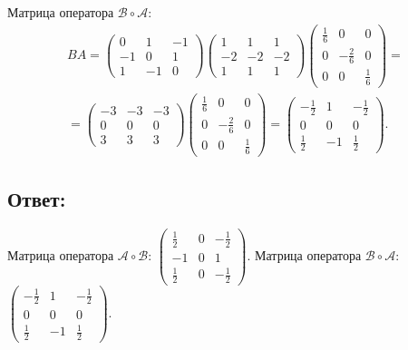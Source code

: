 \documentclass[12pt]{article}
\begin{document}
    Матрица оператора $\mathcal{B} \circ \mathcal{A}$:
    \begin{multline*}
        B A =
        \begin{pmatrix}
            0  & 1  & -1 \\
            -1 & 0  & 1  \\
            1  & -1 & 0
        \end{pmatrix}
        \begin{pmatrix}
            1  & 1  & 1  \\
            -2 & -2 & -2 \\
            1  & 1  & 1
        \end{pmatrix}
        \begin{pmatrix}
            \frac{1}{6} & 0             & 0           \\
            0           & - \frac{2}{6} & 0           \\
            0           & 0             & \frac{1}{6}
        \end{pmatrix} = \\
        =
        \begin{pmatrix}
            -3 & -3 & -3 \\
            0  & 0  & 0  \\
            3  & 3  & 3
        \end{pmatrix}
        \begin{pmatrix}
            \frac{1}{6} & 0             & 0           \\
            0           & - \frac{2}{6} & 0           \\
            0           & 0             & \frac{1}{6}
        \end{pmatrix}
        =
        \begin{pmatrix}
            -\frac{1}{2} & 1   & - \frac{1}{2} \\
            0            & 0   & 0             \\
            \frac{1}{2}  & - 1 & \frac{1}{2}
        \end{pmatrix} .
    \end{multline*}

    \subsection*{Ответ:}
    Матрица оператора $\mathcal{A} \circ \mathcal{B}$:
    $
    \begin{pmatrix}
        \frac{1}{2} & 0 & - \frac{1}{2} \\
        - 1         & 0 & 1             \\
        \frac{1}{2} & 0 & - \frac{1}{2}
    \end{pmatrix}
    $.
    Матрица оператора $\mathcal{B} \circ \mathcal{A}$:
    $
    \begin{pmatrix}
        -\frac{1}{2} & 1   & - \frac{1}{2} \\
        0            & 0   & 0             \\
        \frac{1}{2}  & - 1 & \frac{1}{2}
    \end{pmatrix}
    $.
\end{document}
